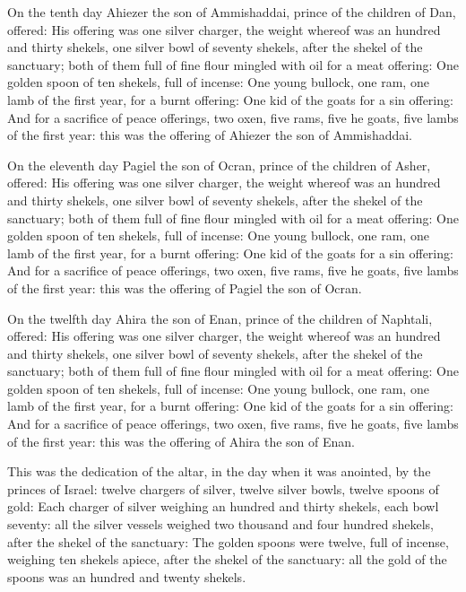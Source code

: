 \Verse On the tenth day Ahiezer the son of Ammishaddai, prince of the
children of Dan, offered: \Verse His offering was one silver charger,
the weight whereof was an hundred and thirty shekels, one silver bowl
of seventy shekels, after the shekel of the sanctuary; both of them
full of fine flour mingled with oil for a meat offering: \Verse One
golden spoon of ten shekels, full of incense: \Verse One young bullock,
one ram, one lamb of the first year, for a burnt offering: \Verse One
kid of the goats for a sin offering: \Verse And for a sacrifice of peace
offerings, two oxen, five rams, five he goats, five lambs of the first
year: this was the offering of Ahiezer the son of Ammishaddai.

\Verse On the eleventh day Pagiel the son of Ocran, prince of the
children of Asher, offered: \Verse His offering was one silver charger,
the weight whereof was an hundred and thirty shekels, one silver bowl
of seventy shekels, after the shekel of the sanctuary; both of them
full of fine flour mingled with oil for a meat offering: \Verse One
golden spoon of ten shekels, full of incense: \Verse One young bullock,
one ram, one lamb of the first year, for a burnt offering: \Verse One
kid of the goats for a sin offering: \Verse And for a sacrifice of peace
offerings, two oxen, five rams, five he goats, five lambs of the first
year: this was the offering of Pagiel the son of Ocran.

\Verse On the twelfth day Ahira the son of Enan, prince of the children
of Naphtali, offered: \Verse His offering was one silver charger, the
weight whereof was an hundred and thirty shekels, one silver bowl of
seventy shekels, after the shekel of the sanctuary; both of them full
of fine flour mingled with oil for a meat offering: \Verse One golden
spoon of ten shekels, full of incense: \Verse One young bullock, one
ram, one lamb of the first year, for a burnt offering: \Verse One kid of
the goats for a sin offering: \Verse And for a sacrifice of peace
offerings, two oxen, five rams, five he goats, five lambs of the first
year: this was the offering of Ahira the son of Enan.

\Verse This was the dedication of the altar, in the day when it was
anointed, by the princes of Israel: twelve chargers of silver, twelve
silver bowls, twelve spoons of gold: \Verse Each charger of silver
weighing an hundred and thirty shekels, each bowl seventy: all the
silver vessels weighed two thousand and four hundred shekels, after
the shekel of the sanctuary: \Verse The golden spoons were twelve, full
of incense, weighing ten shekels apiece, after the shekel of the
sanctuary: all the gold of the spoons was an hundred and twenty
shekels.

